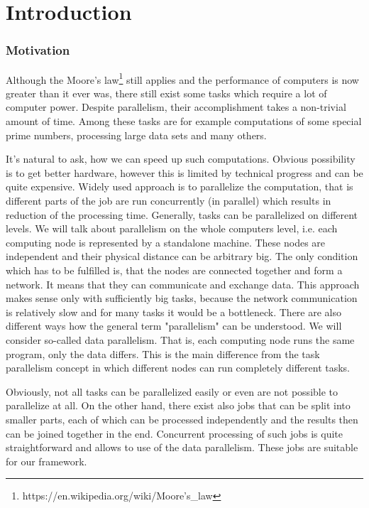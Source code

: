 \chapter*{Introduction}
\subsection*{Motivation}

Although the Moore's law\footnote{https://en.wikipedia.org/wiki/Moore's\_law} still applies and the performance of computers is now greater than it ever was, there still exist some tasks which require a lot of computer power. Despite parallelism, their accomplishment takes a non-trivial amount of time. Among these tasks are for example computations of some special prime numbers, processing large data sets and many others.

It's natural to ask, how we can speed up such computations. Obvious possibility is to get better hardware, however this is limited by technical progress and can be quite expensive. Widely used approach is to parallelize the computation, that is different parts of the job are run concurrently (in parallel) which results in reduction of the processing time. Generally, tasks can be parallelized on different levels. We will talk about parallelism on the whole computers level, i.e. each computing node is represented by a standalone machine. These nodes are independent and their physical distance can be arbitrary big. The only condition which has to be fulfilled is, that the nodes are connected together and form a network. It means that they can communicate and exchange data. This approach makes sense only with sufficiently big tasks, because the network communication is relatively slow and for many tasks it would be a bottleneck. There are also different ways how the general term "parallelism" can be understood. We will consider so-called data parallelism. That is, each computing node runs the same program, only the data differs. This is the main difference from the task parallelism concept in which different nodes can run completely different tasks.

Obviously, not all tasks can be parallelized easily or even are not possible to parallelize at all. On the other hand, there exist also jobs that can be split into smaller parts, each of which can be processed independently and the results then can be joined together in the end. Concurrent processing of such jobs is quite straightforward and allows to use of the data parallelism. These jobs are suitable for our framework.

